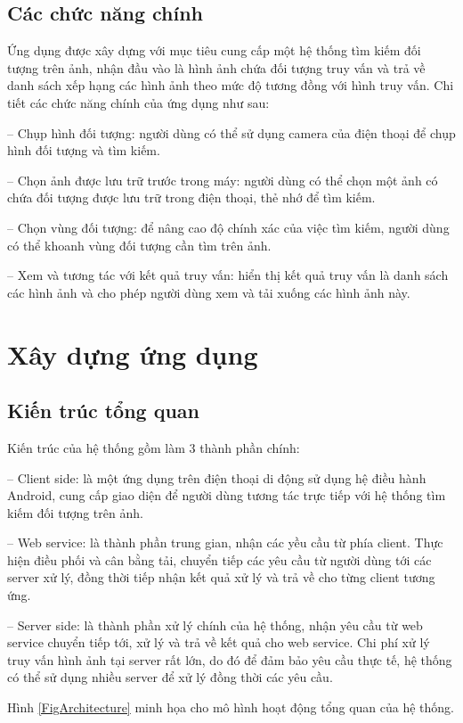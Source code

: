 	\subsection{Các chức năng chính}
Ứng dụng được xây dựng với mục tiêu cung cấp một hệ thống tìm kiếm đối tượng trên ảnh, nhận đầu vào là hình ảnh chứa đối tượng truy vấn và trả về danh sách xếp hạng các hình ảnh theo mức độ tương đồng với hình truy vấn. Chi tiết các chức năng chính của ứng dụng như sau:

-- Chụp hình đối tượng: người dùng có thể sử dụng camera của điện thoại để chụp hình đối tượng và tìm kiếm.

-- Chọn ảnh được lưu trữ trước trong máy: người dùng có thể chọn một ảnh có chứa đối tượng được lưu trữ trong điện thoại, thẻ nhớ để tìm kiếm.

-- Chọn vùng đối tượng: để nâng cao độ chính xác của việc tìm kiếm, người dùng có thể khoanh vùng đối tượng cần tìm trên ảnh.

-- Xem và tương tác với kết quả truy vấn: hiển thị kết quả truy vấn là danh sách các hình ảnh và cho phép người dùng xem và tải xuống các hình ảnh này.

\section{Xây dựng ứng dụng}
\label{c5-thietke}

	\subsection{Kiến trúc tổng quan}
Kiến trúc của hệ thống gồm làm 3 thành phần chính:

-- Client side: là một ứng dụng trên điện thoại di động sử dụng hệ điều hành Android, cung cấp giao diện để người dùng tương tác trực tiếp với hệ thống tìm kiếm đối tượng trên ảnh.

-- Web service: là thành phần trung gian, nhận các yều cầu từ phía client. Thực hiện điều phối và cân bằng tải, chuyển tiếp các yêu cầu từ người dùng tới các server xử lý, đồng thời tiếp nhận kết quả xử lý và trả về cho từng client tương ứng.

-- Server side: là thành phần xử lý chính của hệ thống, nhận yêu cầu từ web service chuyển tiếp tới, xử lý và trả về kết quả cho web service. Chi phí xử lý truy vấn hình ảnh tại server rất lớn, do đó để đảm bảo yêu cầu thực tế, hệ thống có thể sử dụng nhiều server để xử lý đồng thời các yêu cầu.

Hình \ref{FigArchitecture} minh họa cho mô hình hoạt động tổng quan của hệ thống.

